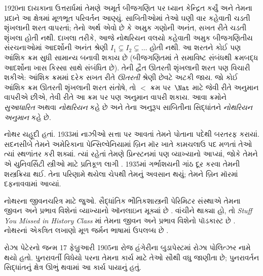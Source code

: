 1920ના દાયકાના ઉત્તરાર્ધમાં તેમણે
અમૂર્ત બીજગણિત પર ધ્યાન કેન્દ્રિત
કર્યું અને તેમના પ્રદાને આ ક્ષેત્રમાં
મૂળભૂત પરિવર્તન આણ્યું. સાબિતીઓમાં
તેઓ ઘણી વાર કહેવાતી ચડતી શૃંખલાની
શરત વાપરતાં; તેનો અર્થ એવો છે કે
અમુક ગણોની અનંત, સખત રીતે ચડતી
શૃંખલા હોતી નથી. દાખલા તરીકે,
આજે નોથરિયન વલયો કહેવાતી અમુક
બીજગણિતીય સંરચનાઓમાં આદર્શોની
અનંત શ્રેણી $I_1
\subsetneq I_2 \subsetneq \dots$
હોતી નથી. આ શરતને કોઈ પણ
આંશિક ક્રમ સુધી સામાન્ય બનાવી
શકાય છે (બીજગણિતમાં તે સમાવિષ્ટ
સંબંધથી ક્રમબદ્ધ આદર્શોના ખાસ
કિસ્સા સાથે સંબંધિત છે). તેની
દ્વૈત ઊતરતી શૃંખલાની શરત પણ
વિચારી શકીએ: આંશિક ક્રમમાં દરેક
સખત રીતે \emph{ઊતરતી} શ્રેણી
છેવટે અટકી જાય. જો કોઈ આંશિક
ક્રમ ઊતરતી શૃંખલાની શરત સંતોષે,
તો $<$ ક્રમ પર~$\Nat$ માટે
જેવી રીતે અનુમાન વાપરીએ છીએ,
તેવી રીતે આ ક્રમ પર પણ અનુમાન
વાપરી શકાય. આવા ક્રમોને
\emph{સુઆધારિત} અથવા
\emph{નોથરિયન} કહે છે અને
તેના અનુરૂપ સાબિતીના સિદ્ધાંતને
\emph{નોથરિયન અનુમાન} કહે છે.

નોથર યહૂદી હતાં. 1933માં નાઝીઓ
સત્તા પર આવતાં તેમને પોતાના
પદેથી બરતરફ કરાયાં. સદનસીબે
તેમને અમેરિકાના પેન્સિલ્વેનિયામાં
બ્રિન મૉર ખાતે કામચલાઉ પદ
મળતાં તેઓ ત્યાં સ્થળાંતર કરી
શક્યાં. ત્યાં રહેતાં તેમણે
પ્રિન્સ્ટનમાં પણ વ્યાખ્યાનો આપ્યાં,
જોકે તેમને એ યુનિવર્સિટી
સ્ત્રીઓ માટે પ્રતિકૂળ લાગી
\citep[81]{Dick1981}. 1935માં
ગર્ભાશયની ગાંઠ દૂર કરવા
તેમની શસ્ત્રક્રિયા થઈ. તેના
પરિણામે થયેલા ચેપથી તેમનું
અવસાન થયું; તેમને બ્રિન
મૉરમાં દફનાવવામાં આવ્યાં.

\begin{reading} 
નોથરના જીવનચરિત્ર માટે
\citet{Dick1981} જુઓ. સૈદ્ધાંતિક
ભૌતિકશાસ્ત્રની પેરિમિટર
સંસ્થાએ તેમના જીવન અને
પ્રભાવ વિશેનાં વ્યાખ્યાનો
ઑનલાઇન મૂક્યાં છે
\citep{Perimeter2015}. વાંચીને
થાક્યા હો, તો
\emph{Stuff You Missed in History Class}
માં તેમના જીવન અને પ્રભાવ
વિશેનો પૉડકાસ્ટ છે
\citep{Frey2015}. નોથરનાં
એકત્રિત લખાણો મૂળ જર્મન
ભાષામાં ઉપલબ્ધ છે
\citep{Noether1983}.
\end{reading}
\endgroup


\begingroup
\makeatletter{}\makeatother


\label{guunit:OLP-0627}


 
રોઝા પેટેરનો જન્મ 17 ફેબ્રુઆરી 1905ના
રોજ હંગેરીના બુડાપેસ્ટમાં રોઝા પોલિત્ઝર
નામે થયો હતો. પુનરાવર્તી વિધેયો પરના
તેમના કાર્ય માટે તેઓ સૌથી વધુ જાણીતા
છે; પુનરાવર્તન સિદ્ધાંતનું ક્ષેત્ર ઊભું
થવામાં આ કાર્ય પાયાનું હતું.

